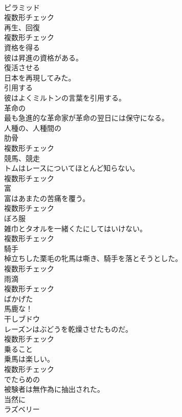 \documentclass[8pt]{extreport}
\begin{document}
\begin{CJK}{UTF8}{min}
\\	[名詞]	ピラミッド	
\\	複数形チェック
\\	[名詞]	再生、回復	
\\	複数形チェック
\\	[動詞]	資格を得る	
\\	彼は昇進の資格がある。	
\\	[動詞]	復活させる	
\\	日本を再現してみた。	
\\	[動詞]	引用する	
\\	彼はよくミルトンの言葉を引用する。	
\\	[形容詞]	革命の	
\\	最も急進的な革命家が革命の翌日には保守になる。	
\\	[形容詞]	人種の、人種間の	
\\	[名詞]	肋骨	
\\	複数形チェック
\\	[名詞]	競馬、競走	
\\	トムはレースについてほとんど知らない。	
\\	複数形チェック
\\	[名詞]	富	
\\	富はあまたの苦痛を覆う。	
\\	複数形チェック
\\	[名詞]	ぼろ服	
\\	雑巾とタオルを一緒くたにしてはいけない。	
\\	複数形チェック
\\	[名詞]	騎手	
\\	棹立ちした栗毛の牝馬は嘶き、騎手を落とそうとした。	
\\	複数形チェック
\\	[名詞]	雨滴	
\\	複数形チェック
\\	[形容詞]	ばかげた	
\\	馬鹿な！	
\\	[名詞]	干しブドウ	
\\	レーズンはぶどうを乾燥させたものだ。	
\\	複数形チェック
\\	[名詞]	乗ること	
\\	乗馬は楽しい。	
\\	複数形チェック
\\	[形容詞]	でたらめの	
\\	被験者は無作為に抽出された。	
\\	[副詞]	当然に	
\\	[名詞]	ラズベリー	

\end{CJK}
\end{document}
